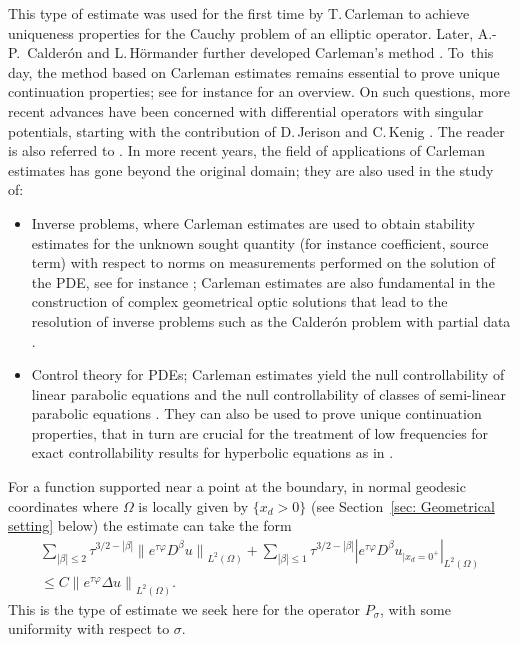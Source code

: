\documentclass[10pt]{amsart}
\theoremstyle{plain}
\theoremstyle{definition}
\newcommand{\br}{\ensuremath{_{|x_d=0^+}}}
\newcommand{\Norm}[2]{{\| #1 \|}_{#2}}
\newcommand{\norm}[2]{{|#1|}_{#2}}
\newcommand{\Psig}{P_{\sigma}}
\begin{document}
This type of estimate was used for the first time by T.\,Carleman
\cite{Carleman:39} to achieve uniqueness properties for the Cauchy
problem of an elliptic operator. Later, A.\nobreakdash-P.\ Calderón and
L.\,Hörmander further developed Carleman's method
\cite{Calderon:58,Hoermander:58}. To~this day, the method based on Carleman estimates
remains essential to prove unique continuation properties;
see for instance \cite{Zuily:83} for an overview. On such questions,
more recent advances have been concerned with differential operators
with singular potentials, starting with the contribution of D.\,Jerison
and C.\,Kenig \cite{JK:85}. The reader is also referred to \cite{Sogge:89,KT:01,KT:02,DDSF:05,KT:05}.
In more recent years, the field of applications of Carleman estimates
has gone beyond the original domain; they are also used in the study
of:
\begin{itemize}
\item Inverse problems, where Carleman estimates are used to obtain
stability estimates for the unknown sought quantity (for instance
coefficient, source term) with respect to norms on measurements
performed on the solution of the PDE, see for instance
\cite{BK:81,Isakov:98,Kubo:00,IIY:03}; Carleman estimates are also
fundamental in the construction of complex geometrical optic solutions
that lead to the resolution of inverse problems such as the Calderón
problem with partial data \cite{KSU:07,DKSU:09}.

\item Control theory for PDEs; Carleman estimates yield the null controllability of linear parabolic equations
\cite{LR:95} and the null controllability of classes of semi-linear
parabolic equations \cite{FI:96,Barbu:00,FZ:00}.
They can also be used to prove unique continuation properties, that in
turn are crucial for the treatment of low frequencies for exact
controllability results for hyperbolic equations as in \cite{BLR:92}.
\end{itemize}

For a function supported near a point at the boundary, in normal geodesic coordinates where $\Omega$ is locally given by $\{
x_d >0\}$ (see Section~\ref{sec:
Geometrical setting} below) the estimate
can take the form
\begin{multline*}
\sum_{|\beta|\leq 2} \tau^{3/2-|\beta|}
\Norm{e^{\tau\varphi} D^\beta u}{L^2(\Omega)}
+ \sum_{|\beta|\leq 1} \tau^{3/2-|\beta|}
\norm{e^{\tau\varphi} D^\beta u\br}{L^2(\Omega)}\\
\leq C \Norm{e^{\tau\varphi} \Delta u}{L^2(\Omega)}.
\end{multline*}
This is the type of estimate we seek here for the operator $\Psig$,
with some uniformity with respect to $\sigma$.
\end{document}
